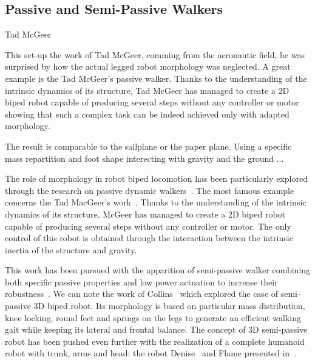 \subsection{Passive and Semi-Passive Walkers} %

Tad McGeer


This set-up the work of Tad McGeer, comming from the aeronautic field, he was surprised by how the actual legged robot morphology was neglected. A great example is the Tad McGeer's passive walker. Thanks to the understanding of the intrinsic dynamics of its structure, Tad McGeer has managed to create a 2D biped robot capable of producing several steps without any controller or motor showing that such a complex task can be indeed achieved only with adapted morphology\cite{mcgeer1990passive}.

The result is comparable to the sailplane or the paper plane. Using a specific mass repartition and foot shape interecting with gravity and the ground ...

The role of morphology in robot biped locomotion has been particularly explored through the research on passive dynamic walkers~\cite{wisse2007passive}.
The most famous example concerns the Tad MacGeer's work~\cite{mcgeer1990passive}.
Thanks to the understanding of the intrinsic dynamics of its structure, McGeer has managed to create a 2D biped robot capable of producing several steps without any controller or motor.
The only control of this robot is obtained through the interaction between the intrinsic inertia of the structure and gravity.

\begin{figure}[]
\centering
    \hfil
    \caption{}
    \label{fig:mcgeer_work}
\end{figure}

This work has been pursued with the apparition of semi-passive walker combining both specific passive properties and low power actuation to increase their robustness~\cite{Anderson2005}.
We can note the work of Collins~\cite{collins2005bipedal} which explored the case of semi-passive 3D biped robot.
Its morphology is based on particular mass distribution, knee locking, round feet and springs on the legs to generate an efficient walking gait while keeping its lateral and frontal balance.
The concept of 3D semi-passive robot has been pushed even further with the realization of a complete humanoid robot with trunk, arms and head: the robot Denise~\cite{wisse2005three} and Flame presented in~\cite{Hobbelen2008}.

